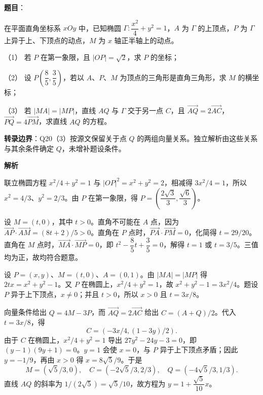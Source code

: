 \begin{answer}

\textbf{题目}：

在平面直角坐标系 $xOy$ 中，已知椭圆 $\Gamma:\dfrac{x^2}{4}+y^2=1$，$A$ 为 $\Gamma$ 的上顶点，$P$ 为 $\Gamma$ 上异于上、下顶点的动点，$M$ 为 $x$ 轴正半轴上的动点。

（1） 若 $P$ 在第一象限，且 $|OP|=\sqrt2$，求 $P$ 的坐标；

（2） 设 $P\left(\dfrac85,\dfrac35\right)$，若以 $A\text{、}P\text{、}M$ 为顶点的三角形是直角三角形，求 $M$ 的横坐标；

（3） 若 $|MA|=|MP|$，直线 $AQ$ 与 $\Gamma$ 交于另一点 $C$，且 $\overrightarrow{AQ}=2\overrightarrow{AC}$，$\overrightarrow{PQ}=4\overrightarrow{PM}$，求直线 $AQ$ 的方程。

\begin{gktip}
\textbf{转录边界}：Q20（3）按源文保留关于点 $Q$ 的两组向量关系。独立解析由这些关系与其余条件确定 $Q$，未增补题设条件。
\end{gktip}

\textbf{解析}


联立椭圆方程 $x^2/4+y^2=1$ 与 $|OP|^2=x^2+y^2=2$，相减得 $3x^2/4=1$，所以 $x^2=4/3$、$y^2=2/3$。由 $P$ 在第一象限，得 $P=(\dfrac{2\sqrt3}{3},\dfrac{\sqrt6}{3})$。


设 $M=(t,0)$，其中 $t>0$。直角不可能在 $A$ 点，因为 $\overrightarrow{AP}\cdot\overrightarrow{AM}=(8t+2)/5>0$。直角在 $P$ 点时，$\overrightarrow{PA}\cdot\overrightarrow{PM}=0$，化简得 $t=29/20$。直角在 $M$ 点时，$\overrightarrow{MA}\cdot\overrightarrow{MP}=0$，即 $t^2-\dfrac85t+\dfrac35=0$，解得 $t=1$ 或 $t=3/5$。三值均为正，故均符合题意。


设 $P=(x,y)$、$M=(t,0)$、$A=(0,1)$。由 $|MA|=|MP|$ 得 $2tx=x^2+y^2-1$。又 $P$ 在椭圆上，$x^2/4+y^2=1$，故 $x^2+y^2-1=3x^2/4$。题设 $P$ 异于上下顶点，$x\ne0$；并且 $t>0$，所以 $x>0$ 且 $t=3x/8$。

向量条件给出 $Q=4M-3P$，而 $\overrightarrow{AQ}=2\overrightarrow{AC}$ 给出 $C=(A+Q)/2$。代入 $t=3x/8$，得
\nopagebreak[4]
\[
C=(-3x/4,(1-3y)/2).
\]
由于 $C$ 在椭圆上，$x^2/4+y^2=1$ 导出 $27y^2-24y-3=0$，即 $(y-1)(9y+1)=0$。$y=1$ 会使 $x=0$，与 $P$ 异于上下顶点矛盾；因此 $y=-1/9$，再由 $x>0$ 得 $x=8\sqrt5/9$。于是
\nopagebreak[4]
\[
M=(\sqrt5/3,0),\quad C=(-2\sqrt5/3,2/3),\quad Q=(-4\sqrt5/3,1/3).
\]
直线 $AQ$ 的斜率为 $1/(2\sqrt5)=\sqrt5/10$，故方程为 $y=1+\dfrac{\sqrt5}{10}x$。




\end{answer}
